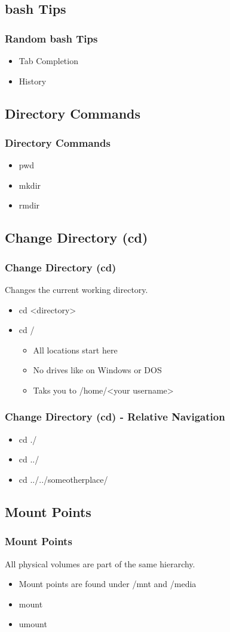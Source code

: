 \documentclass[hyperref={pdfpagelabels=false}]{beamer}
\begin{document}
\subsection{bash Tips}	
\frame
{
    \frametitle{Random bash Tips}
    \begin{itemize}
    \item{Tab Completion}
    \item{History}
    \end{itemize}
}
\subsection{Directory Commands}
\frame
{
    \frametitle{Directory Commands}
    \begin{itemize}
    \item{pwd}
    \item{mkdir}
    \item{rmdir}
    \end{itemize}
}
\subsection{Change Directory (cd)}
\frame
{
    \frametitle{Change Directory (cd)}
    Changes the current working directory.
    \begin{itemize}
    \item{cd <directory>}
    \item{cd /}
        \begin{itemize}
        \item{All locations start here}
        \item{No drives like on Windows or DOS}
        \end{itemize}
        \begin{itemize}
        \item{Taks you to /home/<your username>}
        \end{itemize}
    \end{itemize}
}
\frame
{
    \frametitle{Change Directory (cd) - Relative Navigation}
    \begin{itemize}
    \item{cd ./}
    \item{cd ../}
    \item{cd ../../someotherplace/}
    \end{itemize}
}
\subsection{Mount Points}
\frame
{
    \frametitle{Mount Points}
    All physical volumes are part of the same hierarchy.
    \begin{itemize}
    \item{Mount points are found under /mnt and /media}
    \item{mount}
    \item{umount}
    \end{itemize}
}
\end{document}
